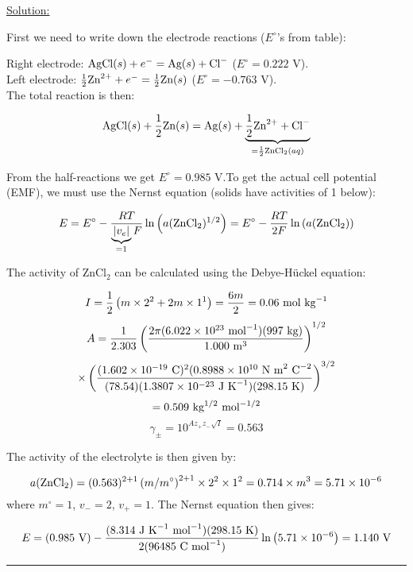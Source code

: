 \noindent
\underline{Solution:}

First we need to write down the electrode reactions ($E^\circ$'s from table):

Right electrode: $\textnormal{AgCl}(s) + e^- = \textnormal{Ag}(s) + \textnormal{Cl}^-$ ($E^\circ = 0.222$ V).\\
Left electrode: $\frac{1}{2}\textnormal{Zn}^{2+} + e^- = \frac{1}{2}\textnormal{Zn}(s)$ ($E^\circ = -0.763$ V).\\

The total reaction is then:

$$\textnormal{AgCl}(s) + \frac{1}{2}\textnormal{Zn}(s) = \textnormal{Ag}(s) + \mathop {\underbrace{\frac{1}{2}\textnormal{Zn}^{2+} + \textnormal{Cl}^-}}\limits_{=\frac{1}{2}\textnormal{ZnCl}_2(aq)}$$

From the half-reactions we get $E^\circ = 0.985$ V.To get the actual cell potential (EMF), we must use the Nernst equation (solids have activities of 1 below):

$$E = E^\circ - \frac{RT}{\mathop {\underbrace{\left|v_e\right|}}\limits_{=1}F}\ln\left(a(\textnormal{ZnCl}_2)^{1/2}\right) = E^\circ - \frac{RT}{2F}\ln\left(a(\textnormal{ZnCl}_2)\right)$$

The activity of ZnCl$_2$ can be calculated using the Debye-H\"uckel equation:

$$I = \frac{1}{2}\left(m\times 2^2 + 2m\times 1^1\right) = \frac{6m}{2} = 0.06\textnormal{ mol kg}^{-1}$$
$$A = \frac{1}{2.303}\left(\frac{2\pi(6.022\times 10^{23}\textnormal{ mol}^{-1})(997\textnormal{ kg})}{1.000\textnormal{ m}^3}\right)^{1/2}$$
$$\times\left(\frac{(1.602\times 10^{-19}\textnormal{ C})^2(0.8988\times 10^{10}\textnormal{ N m}^2\textnormal{ C}^{-2}}{(78.54)(1.3807\times 10^{-23}\textnormal{ J K}^{-1})(298.15\textnormal{ K})}\right)^{3/2}$$
$$ = 0.509\textnormal{ kg}^{1/2}\textnormal{ mol}^{-1/2}$$
$$\gamma_\pm = 10^{Az_+z_-\sqrt{I}} = 0.563$$

The activity of the electrolyte is then given by:

$$a(\textnormal{ZnCl}_2) = (0.563)^{2+1}\left(m/m^\circ\right)^{2+1}\times 2^2\times 1^2 = 0.714\times m^3 = 5.71\times 10^{-6}$$
where $m^\circ = 1$, $v_- = 2$, $v_+ = 1$. The Nernst equation then gives:

$$E = (0.985\textnormal{ V}) - \frac{(8.314\textnormal{ J K}^{-1}\textnormal{ mol}^{-1})(298.15\textnormal{ K})}{2(96485\textnormal{ C mol}^{-1})}\ln\left(5.71\times 10^{-6}\right) = 1.140\textnormal{ V}$$

\hrule\vspace{0.5cm}
